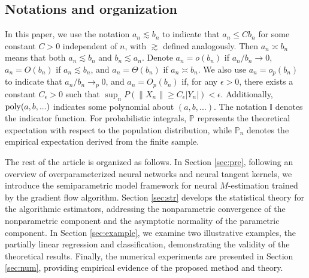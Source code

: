 \subsection{Notations and organization}


In this paper, we use the notation \( a_n \lesssim b_n \) to indicate that \( a_n \leq C b_n \) for some constant \( C > 0 \) independent of \( n \), with \( \gtrsim \) defined analogously. Then \( a_n \asymp b_n \) means that both \( a_n \lesssim b_n \) and \( b_n \lesssim a_n \). Denote \( a_n = o(b_n) \) if \(a_n/b_n \to 0 \), \( a_n = O(b_n) \) if \( a_n \lesssim b_n \), and \( a_n = \Theta(b_n) \) if \( a_n \asymp b_n \). 
We also use \( a_n = o_p(b_n) \) to indicate that \( a_n/b_n \to_p 0 \), and \( a_n = O_p(b_n) \) if, for any \( \epsilon > 0 \), there exists a constant \( C_\epsilon > 0 \) such that \( \sup_n P\left( \| X_n \| \geq C_\epsilon |Y_n| \right) < \epsilon \).
Additionally, $\operatorname{poly}(a,b,...)$ indicates some polynomial about $(a,b,...)$.
The notation \( \mathbb{I} \) denotes the indicator function. 
For probabilistic integrals, \( \mathbb{P} \) represents the theoretical expectation with respect to the population distribution, while \( \mathbb{P}_n \) denotes the empirical expectation derived from the finite sample.









The rest of the article is organized as follows. 
In Section \ref{sec:pre}, following an overview of overparameterized neural networks and neural tangent kernels, we introduce the semiparametric model framework for neural $M$-estimation trained by the gradient flow algorithm.  Section \ref{sec:str} develops the statistical theory for the algorithmic estimators, addressing the nonparametric convergence of the nonparametric component and the asymptotic normality of the parametric component. In Section \ref{sec:example}, we examine two illustrative examples, the partially linear regression and classification, demonstrating the validity of the theoretical results. 
Finally, the numerical experiments are presented in Section \ref{sec:num}, providing empirical evidence of the proposed method and theory. 





















